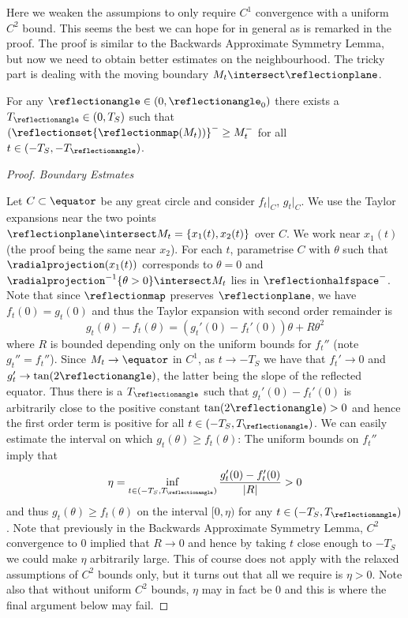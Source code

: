 \documentclass[12pt]{amsart}
\begin{document}
Here we weaken the assumpions to only require \(C^1\) convergence with a uniform \(C^2\) bound. This seems the best we can hope for in general as is remarked in the proof. The proof is similar to the Backwards Approximate Symmetry Lemma, but now we need to obtain better estimates on the neighbourhood. The tricky part is dealing with the moving boundary \(M_t \intersect \reflectionplane\).

\begin{lemma}
\label{lem:approximate_symmetry}
For any \(\reflectionangle \in (0,\reflectionangle_0)\) there exists a \(T_{\reflectionangle} \in (0, T_S)\) such that \((\reflectionset{\reflectionmap(M_t))}^- \geq M_t^-\) for all \(t \in (-T_S, -T_{\reflectionangle})\).
\end{lemma}

\begin{proof}

\emph{Boundary Estmates}

Let \(C\subset \equator\) be any great circle and consider \(f_t|_C\), \(g_t|_C\). We use the Taylor expansions near the two points \(\reflectionplane \intersect M_t = \{x_1(t), x_2(t)\}\) over \(C\). We work near \(x_1(t)\) (the proof being the same near \(x_2\)). For each \(t\), parametrise \(C\) with \(\theta\) such that \(\radialprojection(x_1(t))\) corresponds to \(\theta = 0\) and \(\radialprojection^{-1}\{\theta>0\} \intersect M_t\) lies in \(\reflectionhalfspace^-\). Note that since \(\reflectionmap\) preserves \(\reflectionplane\), we have \(f_t(0) = g_t(0)\) and thus the Taylor expansion with second order remainder is
\[
g_t(\theta) - f_t (\theta) = (g_t'(0) - f_t'(0)) \theta + R \theta^2
\]
where \(R\) is bounded depending only on the uniform bounds for \(f_t''\) (note \(g_t'' = f_t''\)). Since \(M_t \to \equator\) in \(C^1\), as \(t\to -T_S\) we have that \(f_t' \to 0\) and \(g_t' \to \tan(2\reflectionangle)\), the latter being the slope of the reflected equator. Thus there is a \(T_{\reflectionangle}\) such that \(g_t'(0) - f_t'(0)\) is arbitrarily close to the positive constant \(\tan(2\reflectionangle) > 0\) and hence the first order term is positive for all \(t \in (-T_S, T_{\reflectionangle})\). We can easily estimate the interval on which \(g_t(\theta) \geq f_t (\theta)\): The uniform bounds on \(f_t''\) imply that
\[
\eta = \inf_{t \in (-T_S, T_{\reflectionangle})} \frac{g_t'(0) - f_t'(0)}{|R|} > 0
\]
and thus \(g_t(\theta) \geq f_t (\theta)\) on the interval \([0, \eta)\) for any \(t \in (-T_S, T_{\reflectionangle})\). Note that previously in the Backwards Approximate Symmetry Lemma, \(C^2\) convergence to \(0\) implied that \(R\to 0\) and hence by taking \(t\) close enough to \(-T_S\) we could make \(\eta\) arbitrarily large. This of course does not apply with the relaxed assumptions of \(C^2\) bounds only, but it turns out that all we require is \(\eta > 0\). Note also that without uniform \(C^2\) bounds, \(\eta\) may in fact be \(0\) and this is where the final argument below may fail.


\end{proof}
\end{document}
